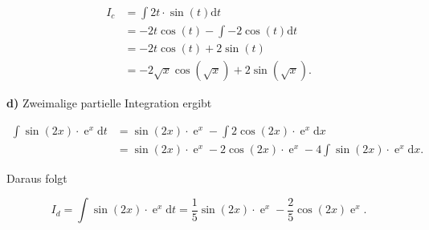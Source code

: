 { \begin{equation*}
 \begin{aligned}
 I_c & = \int 2t \cdot \sin(t) \mathrm{d}  t\\[1ex]
 & = -2t \cos (t) - \int -2 \cos (t) \mathrm{d}  t \\[1ex]
 & = -2t \cos (t) + 2\sin(t) \\[1ex]
 & = -2 \sqrt{x} \cos (\sqrt{x}) + 2 \sin (\sqrt{x}).
 \end{aligned}
 \end{equation*}
\bigskip

\textbf{d)} Zweimalige partielle Integration ergibt
 
 \begin{equation*}
 \begin{aligned}
 \int \sin(2x) \cdot \operatorname{e}^x \mathrm{d}  t & = \sin(2x) \cdot \operatorname{e}^x - \int 2 \cos(2x) \cdot \operatorname{e}^x \mathrm{d}  x \\[1ex]
 & = \sin(2x) \cdot \operatorname{e}^x - 2 \cos(2x) \cdot \operatorname{e}^x - 4 \int \sin(2x) \cdot \operatorname{e}^x \mathrm{d}  x .
 \end{aligned}
 \end{equation*} 
 
 Daraus folgt
 
 \begin{equation*}
 I_d = \int \sin(2x) \cdot \operatorname{e}^x \mathrm{d}  t = \frac{1}{5} \sin(2x) \cdot \operatorname{e}^x - \frac{2}{5} \cos(2x) \operatorname{e}^x .
 \end{equation*}

}

% 
